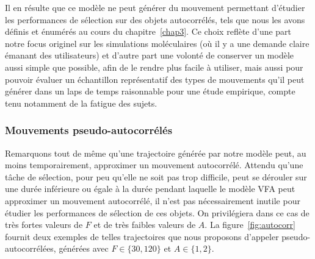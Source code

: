     Il en résulte que ce modèle ne peut générer du mouvement permettant d'étudier les performances de sélection sur des objets autocorrélés, tels que nous les avons définis et énumérés au cours du chapitre~\ref{chap3}. Ce choix reflète d'une part notre focus originel sur les simulations moléculaires (où il y a une demande claire émanant des utilisateurs) et d'autre part une volonté de conserver un modèle aussi simple que possible, afin de le rendre plus facile à utiliser, mais aussi pour pouvoir évaluer un échantillon représentatif des types de mouvements qu'il peut générer dans un laps de temps raisonnable pour une étude empirique, compte tenu notamment de la fatigue des sujets.
    
    \subsubsection{Mouvements pseudo-autocorrélés}
	Remarquons tout de même qu'une trajectoire générée par notre modèle peut, au moins temporairement, approximer un mouvement autocorrélé. Attendu qu'une tâche de sélection, pour peu qu'elle ne soit pas trop difficile, peut se dérouler sur une durée inférieure ou égale à la durée pendant laquelle le modèle VFA peut approximer un mouvement autocorrélé, il n'est pas nécessairement inutile pour étudier les performances de sélection de ces objets. On privilégiera dans ce cas de très fortes valeurs de $F$ et de très faibles valeurs de $A$. La figure~\ref{fig:autocorr} fournit deux exemples de telles trajectoires que nous proposons d'appeler pseudo-autocorrélées, générées avec $F \in \{30,120\}$ et $A \in \{1,2\}$.
	
